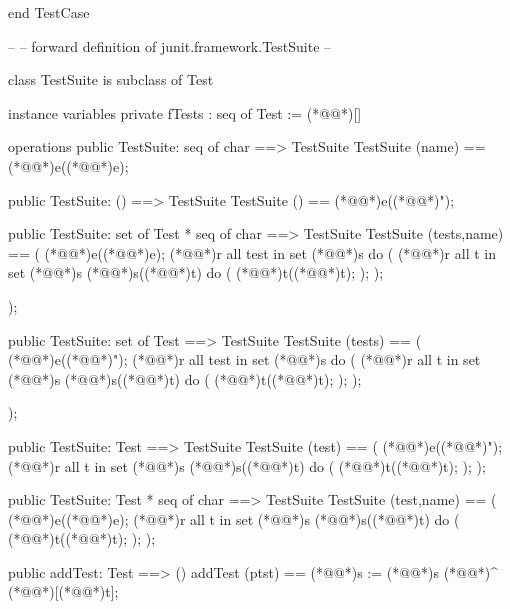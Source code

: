 \documentclass[a4paper]{article}
\begin{document}
\begin{vdm_al}
end TestCase

--
-- forward definition of junit.framework.TestSuite
--

class TestSuite is subclass of Test

instance variables
  private fTests : seq of Test := (*@\vdmnotcovered{}@*)[]
  
operations
  public TestSuite: seq of char ==> TestSuite
  TestSuite (name) == (*@@*)e((*@@*)e);

  public TestSuite: () ==> TestSuite
  TestSuite () == (*@@*)e((*@@*)");

  public TestSuite: set of Test * seq of char ==> TestSuite
  TestSuite (tests,name) == 
  (
    (*@@*)e((*@@*)e);
    (*@@*)r all test in set (*@@*)s do
    (
       (*@@*)r all t in set (*@@*)s (*@@*)s((*@@*)t) do
       (
         (*@@*)t((*@\vdmnotcovered{}@*)t); 
       );
    );
    
  );

  public TestSuite: set of Test ==> TestSuite
  TestSuite (tests) == 
  (
    (*@@*)e((*@@*)");
    (*@@*)r all test in set (*@@*)s do
    (
       (*@@*)r all t in set (*@@*)s (*@@*)s((*@@*)t) do
       (
         (*@@*)t((*@\vdmnotcovered{}@*)t); 
       );
    );
    
  );

  public TestSuite: Test ==> TestSuite
  TestSuite (test) == 
  (
    (*@@*)e((*@@*)");
    (*@@*)r all t in set (*@@*)s (*@@*)s((*@@*)t) do
     (
       (*@@*)t((*@\vdmnotcovered{}@*)t); 
     );
  );

  public TestSuite: Test * seq of char ==> TestSuite
  TestSuite (test,name) == 
  (
    (*@@*)e((*@@*)e);
    (*@@*)r all t in set (*@@*)s (*@@*)s((*@@*)t) do
     (
       (*@@*)t((*@\vdmnotcovered{}@*)t); 
     );
  );
  
  public addTest: Test ==> ()
  addTest (ptst) == (*@@*)s := (*@@*)s (*@\vdmnotcovered{}@*)^ (*@\vdmnotcovered{}@*)[(*@@*)t];
  

\end{vdm_al}
\end{document}
